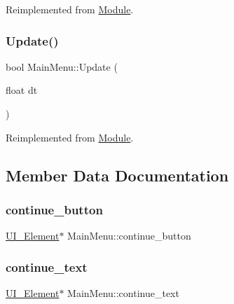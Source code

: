 Reimplemented from \mbox{\hyperlink{class_module_aaf67046743296e8de310039a1dc95d86}{Module}}.

\mbox{\label{class_main_menu_a0c2e38b67627d0ac2315c82ae46cd8ef}} 
\subsubsection{\texorpdfstring{Update()}{Update()}}
{\footnotesize\ttfamily bool Main\+Menu\+::\+Update (\begin{DoxyParamCaption}\item[{float}]{dt }\end{DoxyParamCaption})\hspace{0.3cm}{\ttfamily [virtual]}}



Reimplemented from \mbox{\hyperlink{class_module_ac1a7b6dca73586b9cce2e67647af58d8}{Module}}.



\subsection{Member Data Documentation}
\mbox{\label{class_main_menu_a6448caa41b81885d89a553db5ba0eb48}} 
\subsubsection{\texorpdfstring{continue\_button}{continue\_button}}
{\footnotesize\ttfamily \mbox{\hyperlink{class_u_i___element}{U\+I\+\_\+\+Element}}$\ast$ Main\+Menu\+::continue\+\_\+button}

\mbox{\label{class_main_menu_a08724bba4784093a3dbe695359df3f8d}} 
\subsubsection{\texorpdfstring{continue\_text}{continue\_text}}
{\footnotesize\ttfamily \mbox{\hyperlink{class_u_i___element}{U\+I\+\_\+\+Element}}$\ast$ Main\+Menu\+::continue\+\_\+text}

